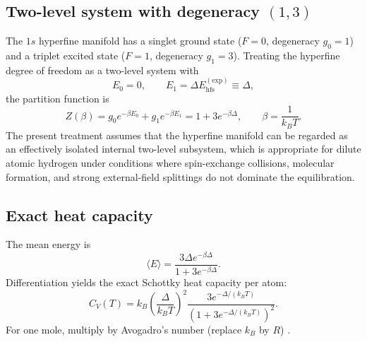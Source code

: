 \documentclass[11pt,a4paper]{article}
\begin{document}
    \subsection{Two-level system with degeneracy $(1,3)$}
        The $1s$ hyperfine manifold has a singlet ground state ($F=0$, degeneracy $g_0=1$)
        and a triplet excited state ($F=1$, degeneracy $g_1=3$).
        Treating the hyperfine degree of freedom as a two-level system with
        \begin{equation}
            E_0=0,\qquad E_1=\Delta E_{\mathrm{hfs}}^{\mathrm{(exp)}}\equiv \Delta,
        \end{equation}
        the partition function is
        \begin{equation}
            Z(\beta)=g_0 e^{-\beta E_0}+g_1 e^{-\beta E_1}
            =1+3e^{-\beta\Delta},
            \qquad
            \beta=\frac{1}{k_B T}.
            \label{eq:Z_hfs}
        \end{equation}
        The present treatment assumes that the hyperfine manifold can be regarded as an effectively isolated internal two-level subsystem,
        which is appropriate for dilute atomic hydrogen under conditions where spin-exchange collisions, molecular formation,
        and strong external-field splittings do not dominate the equilibration.
    
    \subsection{Exact heat capacity}
        The mean energy is
        \begin{equation}
            \langle E\rangle
            =
            \frac{3\Delta e^{-\beta\Delta}}{1+3e^{-\beta\Delta}}.
        \end{equation}
        Differentiation yields the exact Schottky heat capacity per atom:
        \begin{equation}
            \boxed{
                C_V(T)
                =
                k_B\left(\frac{\Delta}{k_B T}\right)^2
                \frac{3e^{-\Delta/(k_B T)}}{\left(1+3e^{-\Delta/(k_B T)}\right)^2}.
            }
            \label{eq:Cv_hfs}
        \end{equation}
        For one mole, multiply by Avogadro's number (replace $k_B$ by $R$) \cite{PathriaBeale2011,KittelKroemer1980}.
    
\end{document}
